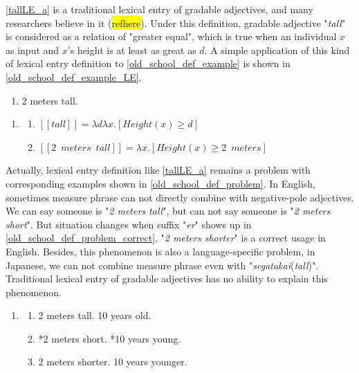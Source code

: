 \documentclass{ctexart}
\begin{document}
\noindent
\ref{tallLE_a} is a traditional lexical entry of gradable adjectives, and many researchers believe in it (\colorbox{yellow}{refhere}). Under this definition, gradable adjective "\textit{tall}" is considered as a relation of "greater equal", which is true when an individual $x$ as input and $x$'s height is at least as great as $d$. A simple application of this kind of lexical entry definition to \ref{old_school_def_example} is shown in \ref{old_school_def_example_LE}.

\begin{enumerate}

    \item \label{old_school_def_example} 2 meters tall.

\end{enumerate}

\begin{enumerate}

    \item \label{old_school_def_example_LE}
    
    \begin{enumerate}
        
        \item $[\![tall]\!]=\lambda d \lambda x.[Height(x) \geq d]$
        \item $[\![2 \enspace meters \enspace tall]\!]=\lambda x.[Height(x) \geq 2 \enspace meters]$

    \end{enumerate}

\end{enumerate}

\noindent
Actually, lexical entry definition like \ref{tallLE_a} remains a problem with corresponding examples shown in \ref{old_school_def_problem}. In English, sometimes measure phrase can not directly combine with negative-pole adjectives. We can say someone is "\textit{2 meters tall}", but can not say someone is "\textit{2 meters short}". But situation changes when suffix "\textit{er}" shows up in \ref{old_school_def_problem_correct}, "\textit{2 meters shorter}" is a correct usage in English. Besides, this phenomenon is also a language-specific problem, in Japanese, we can not combine measure phrase even with "\textit{segatakai}(\textit{tall})". Traditional lexical entry of gradable adjectives has no ability to explain this phenomenon.

\begin{enumerate}

    \item \label{old_school_def_problem}
    
    \begin{enumerate}
        
        \item 2 meters tall. 10 years old.
        \item *2 meters short. *10 years young.
        \item \label{old_school_def_problem_correct} 2 meters shorter. 10 years younger.

    \end{enumerate}

\end{enumerate}
\end{document}
